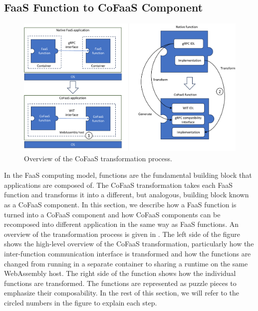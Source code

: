 \subsection{FaaS Function to CoFaaS Component}
\label{subsec:cofaascomp}

\begin{figure}
  \centering
  \includegraphics[width=\textwidth]{figures/components_overview}
  \caption{\label{fig:cofaas-transformation} Overview of the CoFaaS transformation process. }
\end{figure}

In the FaaS computing model, functions are the fundamental building block that applications are composed of. The CoFaaS transformation takes each FaaS function and transforms it into a different, but analogous, building block known as a CoFaaS component. In this section, we describe how a FaaS function is turned into a CoFaaS component and how CoFaaS components can be recomposed into different application in the same way as FaaS functions. An overview of the transformation process is given in . The left side of the figure shows the high-level overview of the CoFaaS transformation, particularly how the inter-function communication interface is transformed and how the functions are changed from running in a separate container to sharing a runtime on the same WebAssembly host. The right side of the function shows how the individual functions are transformed. The functions are represented as puzzle pieces to emphasize their composability. In the rest of this section, we will refer to the circled numbers in the figure to explain each step.


